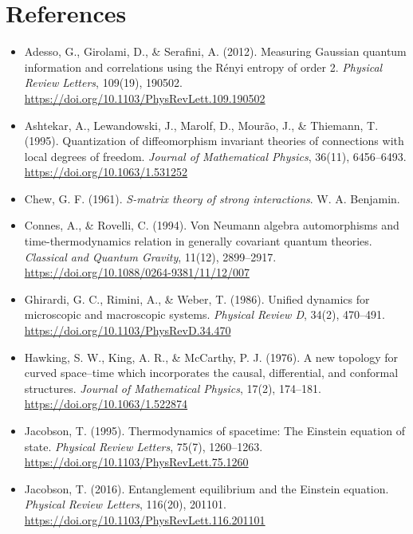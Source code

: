 \documentclass[12pt,a4paper]{article}
\numberwithin{equation}{section}
\begin{document}
\section*{\centering References}
\vspace{0.3cm}
\begin{itemize}[leftmargin=0.5in, itemindent=-0.5in, label={}]

\item Adesso, G., Girolami, D., \& Serafini, A. (2012). Measuring Gaussian quantum information and correlations using the Rényi entropy of order 2. \textit{Physical Review Letters}, 109(19), 190502. \url{https://doi.org/10.1103/PhysRevLett.109.190502}

\item Ashtekar, A., Lewandowski, J., Marolf, D., Mourão, J., \& Thiemann, T. (1995). Quantization of diffeomorphism invariant theories of connections with local degrees of freedom. \textit{Journal of Mathematical Physics}, 36(11), 6456--6493. \url{https://doi.org/10.1063/1.531252}

\item Chew, G. F. (1961). \textit{S-matrix theory of strong interactions}. W. A. Benjamin.

\item Connes, A., \& Rovelli, C. (1994). Von Neumann algebra automorphisms and time-thermodynamics relation in generally covariant quantum theories. \textit{Classical and Quantum Gravity}, 11(12), 2899--2917. \url{https://doi.org/10.1088/0264-9381/11/12/007}

\item Ghirardi, G. C., Rimini, A., \& Weber, T. (1986). Unified dynamics for microscopic and macroscopic systems. \textit{Physical Review D}, 34(2), 470--491. \url{https://doi.org/10.1103/PhysRevD.34.470}

\item Hawking, S. W., King, A. R., \& McCarthy, P. J. (1976). A new topology for curved space--time which incorporates the causal, differential, and conformal structures. \textit{Journal of Mathematical Physics}, 17(2), 174--181. \url{https://doi.org/10.1063/1.522874}

\item Jacobson, T. (1995). Thermodynamics of spacetime: The Einstein equation of state. \textit{Physical Review Letters}, 75(7), 1260--1263. \url{https://doi.org/10.1103/PhysRevLett.75.1260}

\item Jacobson, T. (2016). Entanglement equilibrium and the Einstein equation. \textit{Physical Review Letters}, 116(20), 201101. \url{https://doi.org/10.1103/PhysRevLett.116.201101}


\end{itemize}
\end{document}
